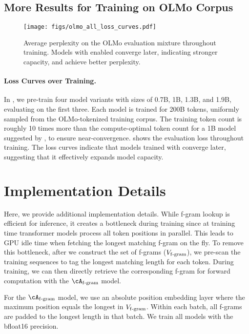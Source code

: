 \subsection{More Results for Training on OLMo Corpus}
\label{subsec:more_exp_dolma}

\begin{figure}[!h]
    \centering
    \texttt{[image: figs/olmo\_all\_loss\_curves.pdf]}
    \caption{Average perplexity on the OLMo evaluation mixture throughout training. Models with \SCONE enabled converge later, indicating stronger capacity, and achieve better perplexity.}
    \label{fig:olmo_all_training_curves}
\end{figure}

\paragraph{Loss Curves over Training.} In , we pre-train four model variants with sizes of 0.7B, 1B, 1.3B, and 1.9B, evaluating \SCONE on the first three. Each model is trained for 200B tokens, uniformly sampled from the OLMo-tokenized training corpus. The training token count is roughly 10 times more than the compute-optimal token count for a 1B model suggested by \citet{hoffmann2022training}, to ensure near-convergence.  shows the evaluation loss throughout training. The loss curves indicate that models trained with \SCONE converge later, suggesting that it effectively expands model capacity.

\section{Implementation Details}\label{sec:implementation_details}

Here, we provide additional implementation details. While f-gram lookup is efficient for inference, it creates a bottleneck during training since at training time transformer models process all token positions in parallel. This leads to GPU idle time when fetching the longest matching f-gram on the fly. To remove this bottleneck, after we construct the set of f-grams ($V_{\mathrm{f\text{-}gram}}$), we pre-scan the training sequences to tag the longest matching length for each token. During training, we can then directly retrieve the corresponding f-gram for forward computation with the $\Afgram$ model.

For the $\Afgram$ model, we use an absolute position embedding layer where the maximum position equals the longest  in $V_{\mathrm{f\text{-}gram}}$. Within each batch, all f-grams are padded to the longest  length in that batch. We train all models with the bfloat16 precision.


